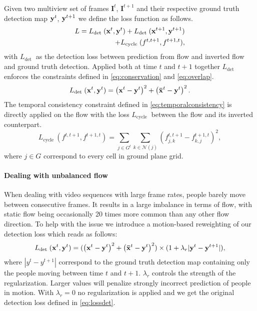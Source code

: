 \documentclass[10pt,twocolumn,letterpaper]{article}
\begin{document}
Given two multiview set of frames $\mathbf{I}^t$, $\mathbf{I}^{t+1}$ and their respective ground truth detection map $\mathbf{y}^t$, $\mathbf{y}^{t+1}$ we define the loss function as follows.
\begin{align}
    L =  L_{\text {det }}(\mathbf{x}^t, \mathbf{y}^t) +  L_{\text {det }}(\mathbf{x}^{t+1}, \mathbf{y}^{t+1}) \nonumber \\
  + L_{\text {cycle }}(f^{t,t+1},f^{t+1,t}),
    \label{eq:loss}
\end{align}
with $ L_{\text {det }}$ as the detection loss between prediction from flow and inverted flow and ground truth detection.
Applied both at time $t$ and $t+1$ together $ L_{\text {det }}$ enforces the constraints defined in \cref{eq:conservation} and \cref{eq:overlap}.
\begin{equation}
    L_{\text {det }}(\mathbf{x}^t, \mathbf{y}^t) = \left(\mathbf{x}^{t}-\mathbf{y}^t\right)^{2} + \left(\mathbf{\bar x}^{t}- \mathbf{y}^t\right)^{2}.
    \label{eq:lossdet}
\end{equation}
The temporal consistency constraint defined in \cref{eq:temporalconsistency} is directly applied on the flow with the loss $L_{\text {cycle }}$ between the flow and its inverted counterpart.
\begin{equation}
    L_{\text {cycle }}(f^{t,t+1},f^{t+1,t}) = \sum_{j \in G^{t}}\sum_{k \in \mathcal{N}(j)}\left(f_{j, k}^{t, t+1}-f_{k, j}^{t+1, t}\right)^{2},
    \label{eq:losscycle}
\end{equation}
where $j \in G$ correspond to every cell in ground plane grid.

\paragraph{Dealing with unbalanced flow} When dealing with video sequences with large frame rates, people barely move between consecutive frames.
It results in a large imbalance in terms of flow, with static flow being occasionally 20 times more common than any other flow direction.
To help with the issue we introduce a motion-based reweighting of our detection loss which reads as follows:
\begin{equation}
L_{\text {det }}(\mathbf{x}^t, \mathbf{y}^t) = (\left(\mathbf{x}^{t}-\mathbf{y}^t\right)^{2}  + \left(\mathbf{\bar x}^{t}- \mathbf{y}^t\right)^{2} )\times (1 + \lambda_r|\mathbf{y}^t - \mathbf{y}^{t+1}|),
\label{eq:reweighting}
\end{equation}
where $|y^t - y^{t+1}|$ correspond to the ground truth detection map containing only the people moving between time $t$ and $t+1$. 
$\lambda_r$ controls the strength of the regularization. Larger values will penalize strongly incorrect prediction of people in motion.
With $\lambda_r=0$ no regularization is applied and we get the original detection loss defined in \cref{eq:lossdet}. 
\end{document}
